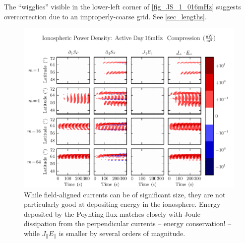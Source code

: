 
The ``wigglies'' visible in the lower-left corner of \cref{fig_JS_1_016mHz} suggests overcorrection due to an improperly-coarse grid. See \cref{sec_lengths}. 


\begin{figure}[H]
    \centering
    \includegraphics[width=\textwidth]{figures/JE_1_016mHz.pdf}
    \caption[Ionospheric Power Density]{
      While field-aligned currents can be of significant size, they are not particularly good at depositing energy in the ionosphere. Energy deposited by the Poynting flux matches closely with Joule dissipation from the perpendicular currents -- energy conservation! -- while $J_\parallel E_\parallel$ is smaller by several orders of magnitude. 
    }
    \label{fig_JE_1_016mHz}
\end{figure}

